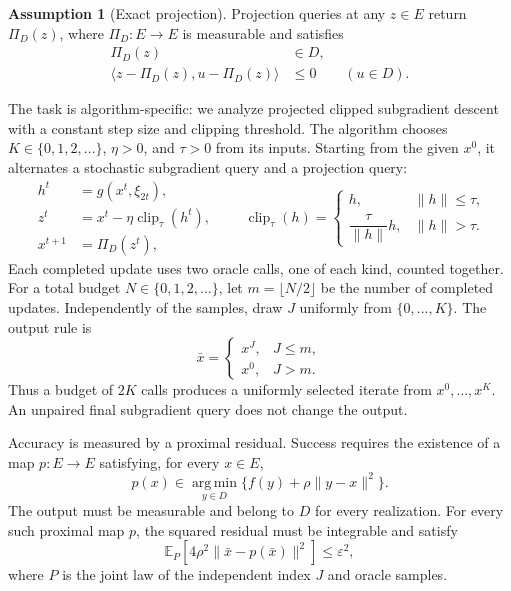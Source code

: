 \documentclass[10pt]{article}
\theoremstyle{definition}
\newtheorem{assumption}{Assumption}
\begin{document}
\begin{assumption}[Exact projection]
Projection queries at any $z\in E$ return $\Pi_D(z)$, where $\Pi_D:E\to E$ is measurable and satisfies
\[
\begin{aligned}
\Pi_D(z)&\in D,\\
\langle z-\Pi_D(z),u-\Pi_D(z)\rangle&\leq0
\qquad(u\in D).
\end{aligned}
\]
\end{assumption}

The task is algorithm-specific: we analyze projected clipped subgradient descent with a constant step size and clipping threshold. The algorithm chooses $K\in\{0,1,2,\ldots\}$, $\eta>0$, and $\tau>0$ from its inputs. Starting from the given $x^0$, it alternates a stochastic subgradient query and a projection query:
\[
\begin{aligned}
h^t&=g(x^t,\xi_{2t}),\\
z^t&=x^t-\eta\operatorname{clip}_{\tau}(h^t),\\
x^{t+1}&=\Pi_D(z^t),
\end{aligned}
\qquad
\operatorname{clip}_{\tau}(h)=
\begin{cases}
h,&\|h\|\leq\tau,\\
\dfrac{\tau}{\|h\|}h,&\|h\|>\tau.
\end{cases}
\]
Each completed update uses two oracle calls, one of each kind, counted together. For a total budget $N\in\{0,1,2,\ldots\}$, let $m=\lfloor N/2\rfloor$ be the number of completed updates. Independently of the samples, draw $J$ uniformly from $\{0,\ldots,K\}$. The output rule is
\[
\bar{x}=
\begin{cases}
x^J,&J\leq m,\\
x^0,&J>m.
\end{cases}
\]
Thus a budget of $2K$ calls produces a uniformly selected iterate from $x^0,\ldots,x^K$. An unpaired final subgradient query does not change the output.

Accuracy is measured by a proximal residual. Success requires the existence of a map $p:E\to E$ satisfying, for every $x\in E$,
\[
p(x)\in\operatorname*{arg\,min}_{y\in D}
\bigl\{f(y)+\rho\|y-x\|^2\bigr\}.
\]
The output must be measurable and belong to $D$ for every realization. For every such proximal map $p$, the squared residual must be integrable and satisfy
\[
\mathbb{E}_{P}\!\left[4\rho^2\|\bar{x}-p(\bar{x})\|^2\right]
\leq\varepsilon^2,
\]
where $P$ is the joint law of the independent index $J$ and oracle samples.
\end{document}
